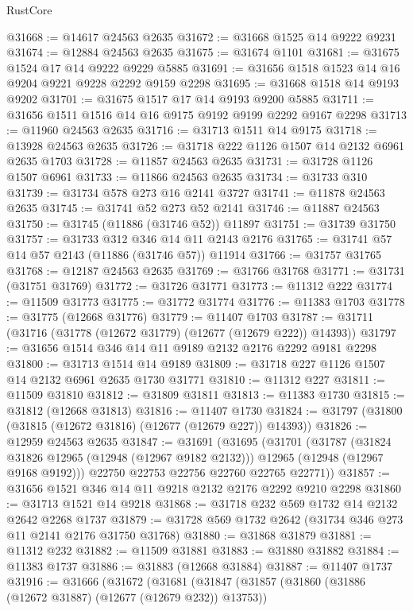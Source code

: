 \begin{lexlean}{RustCore}
\begin{coremodule}
@31668 := @14617 @24563 @2635
@31672 := @31668 @1525 @14 @9222 @9231
@31674 := @12884 @24563 @2635
@31675 := @31674 @1101
@31681 := @31675 @1524 @17 @14 @9222 @9229 @5885
@31691 := @31656 @1518 @1523 @14 @16 @9204 @9221 @9228 @2292 @9159 @2298
@31695 := @31668 @1518 @14 @9193 @9202
@31701 := @31675 @1517 @17 @14 @9193 @9200 @5885
@31711 := @31656 @1511 @1516 @14 @16 @9175 @9192 @9199 @2292 @9167 @2298
@31713 := @11960 @24563 @2635
@31716 := @31713 @1511 @14 @9175
@31718 := @13928 @24563 @2635
@31726 := @31718 @222 @1126 @1507 @14 @2132 @6961 @2635 @1703
@31728 := @11857 @24563 @2635
@31731 := @31728 @1126 @1507 @6961
@31733 := @11866 @24563 @2635
@31734 := @31733 @310
@31739 := @31734 @578 @273 @16 @2141 @3727
@31741 := @11878 @24563 @2635
@31745 := @31741 @52 @273 @52 @2141
@31746 := @11887 @24563
@31750 := @31745 (@11886 (@31746 @52)) @11897
@31751 := @31739 @31750
@31757 := @31733 @312 @346 @14 @11 @2143 @2176
@31765 := @31741 @57 @14 @57 @2143 (@11886 (@31746 @57)) @11914
@31766 := @31757 @31765
@31768 := @12187 @24563 @2635
@31769 := @31766 @31768
@31771 := @31731 (@31751 @31769)
@31772 := @31726 @31771
@31773 := @11312 @222
@31774 := @11509 @31773
@31775 := @31772 @31774
@31776 := @11383 @1703
@31778 := @31775 (@12668 @31776)
@31779 := @11407 @1703
@31787 := @31711 (@31716 (@31778 (@12672 @31779) (@12677 (@12679 @222)) @14393))
@31797 := @31656 @1514 @346 @14 @11 @9189 @2132 @2176 @2292 @9181 @2298
@31800 := @31713 @1514 @14 @9189
@31809 := @31718 @227 @1126 @1507 @14 @2132 @6961 @2635 @1730 @31771
@31810 := @11312 @227
@31811 := @11509 @31810
@31812 := @31809 @31811
@31813 := @11383 @1730
@31815 := @31812 (@12668 @31813)
@31816 := @11407 @1730
@31824 := @31797 (@31800 (@31815 (@12672 @31816) (@12677 (@12679 @227)) @14393))
@31826 := @12959 @24563 @2635
@31847 := @31691
    (@31695
      (@31701
        (@31787
          (@31824 @31826 @12965 (@12948 (@12967 @9182 @2132)))
          @12965
          (@12948 (@12967 @9168 @9192)))
        @22750
        @22753
        @22756
        @22760
        @22765
        @22771))
@31857 := @31656 @1521 @346 @14 @11 @9218 @2132 @2176 @2292 @9210 @2298
@31860 := @31713 @1521 @14 @9218
@31868 := @31718 @232 @569 @1732 @14 @2132 @2642 @2268 @1737
@31879 := @31728 @569 @1732 @2642 (@31734 @346 @273 @11 @2141 @2176 @31750 @31768)
@31880 := @31868 @31879
@31881 := @11312 @232
@31882 := @11509 @31881
@31883 := @31880 @31882
@31884 := @11383 @1737
@31886 := @31883 (@12668 @31884)
@31887 := @11407 @1737
@31916 := @31666
    (@31672
      (@31681
        (@31847
          (@31857
            (@31860 (@31886 (@12672 @31887) (@12677 (@12679 @232)) @13753))

\end{coremodule}
\end{lexlean}
